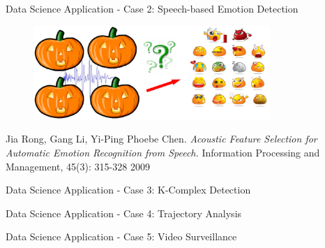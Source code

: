 \documentclass[
 size=14pt,
 paper=smartboard,  %
 mode=present, 		%
 display=slides, 	%
 style=tuliplab,  	%
 pauseslide,
 fleqn,leqno]{powerdot}
\begin{document}
\begin{slide}[toc=,bm=]{Data Science Application - Case 2: Speech-based Emotion Detection}

\begin{figure}
  \includegraphics[width=0.8\textwidth]{figures//theme1//Theme1_22.eps}
\end{figure}

\footnotesize{Jia Rong, Gang Li, Yi-Ping Phoebe Chen.
\emph{Acoustic Feature Selection for Automatic Emotion Recognition from Speech. }
Information Processing and Management, 45(3):  315-328 2009
}

\end{slide}


\begin{slide}[toc=,bm=]{Data Science Application - Case 3: K-Complex Detection}


\end{slide}


\begin{slide}[toc=,bm=]{Data Science Application - Case 4: Trajectory Analysis}


\end{slide}


\begin{slide}[toc=,bm=]{Data Science Application - Case 5: Video Surveillance}
\begin{figure}[ht]
\end{figure}

\end{slide}
\end{document}
